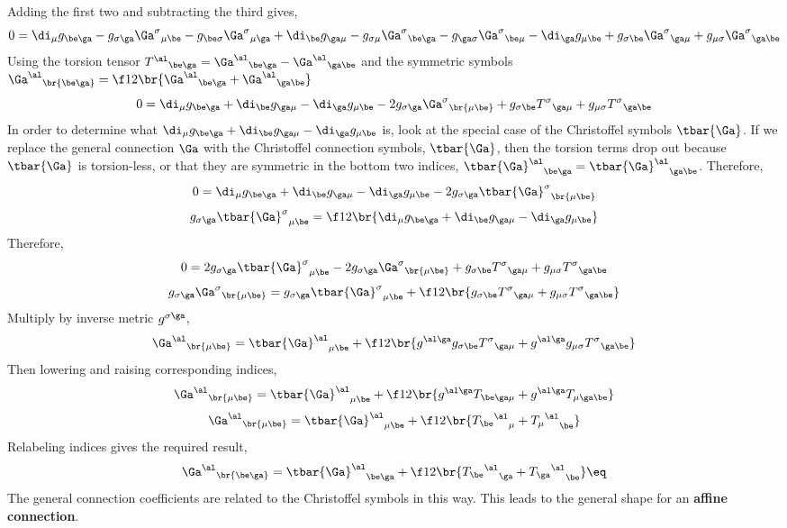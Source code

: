 \documentclass{article}
\begin{document}
Adding the first two and subtracting the third gives,
\[ 0 = \di_\mu g_{\be\ga} - g_{\sigma\ga} {\Ga^\sigma}_{\mu\be}  - g_{\be\sigma}  {\Ga^\sigma}_{\mu\ga} + \di_\be g_{\ga\mu} - g_{\sigma\mu} {\Ga^\sigma}_{\be\ga}  - g_{\ga\sigma}  {\Ga^\sigma}_{\be\mu} - \di_\ga g_{\mu\be} + g_{\sigma\be} {\Ga^\sigma}_{\ga\mu}  + g_{\mu\sigma}  {\Ga^\sigma}_{\ga\be} \]
Using the torsion tensor ${T^{\al}}_{\be\ga} = {\Ga^{\al}}_{\be\ga}- {\Ga^{\al}}_{\ga\be}$ and the symmetric symbols ${\Ga^{\al}}_{\br{\be\ga}} = \f12\br{{\Ga^{\al}}_{\be\ga} + {\Ga^{\al}}_{\ga\be}}$
\[ 0 = \di_\mu g_{\be\ga} + \di_\be g_{\ga\mu} - \di_\ga g_{\mu\be}- 2g_{\sigma\ga} {\Ga^\sigma}_{\br{\mu\be}}+ g_{\sigma\be} {T^\sigma}_{\ga\mu}  + g_{\mu\sigma}  {T^\sigma}_{\ga\be} \]
In order to determine what $\di_\mu g_{\be\ga} + \di_\be g_{\ga\mu} - \di_\ga g_{\mu\be}$ is, look at the special case of the Christoffel symbols $\tbar{\Ga}$. If we replace the general connection $\Ga$ with the Christoffel connection symbols, $\tbar{\Ga}$, then the torsion terms drop out because $\tbar{\Ga}$ is torsion-less, or that they are symmetric in the bottom two indices, ${\tbar{\Ga}^{\al}}_{\be\ga} = {\tbar{\Ga}^{\al}}_{\ga\be}$. Therefore,
\[ 0 = \di_\mu g_{\be\ga} + \di_\be g_{\ga\mu} - \di_\ga g_{\mu\be}- 2g_{\sigma\ga} {\tbar{\Ga}^\sigma}_{\br{\mu\be}} \]
\[ g_{\sigma\ga} {\tbar{\Ga}^\sigma}_{\mu\be} = \f12 \br{\di_\mu g_{\be\ga} + \di_\be g_{\ga\mu} - \di_\ga g_{\mu\be}} \]
Therefore,
\[ 0 = 2g_{\sigma\ga} {\tbar{\Ga}^\sigma}_{\mu\be}- 2g_{\sigma\ga} {\Ga^\sigma}_{\br{\mu\be}}+ g_{\sigma\be} {T^\sigma}_{\ga\mu}  + g_{\mu\sigma}  {T^\sigma}_{\ga\be} \]
\[ g_{\sigma\ga} {\Ga^\sigma}_{\br{\mu\be}} = g_{\sigma\ga} {\tbar{\Ga}^\sigma}_{\mu\be} + \f12\br{g_{\sigma\be} {T^\sigma}_{\ga\mu}  + g_{\mu\sigma}  {T^\sigma}_{\ga\be}} \]
Multiply by inverse metric $g^{\sigma\ga}$,
\[  {\Ga^\al}_{\br{\mu\be}} = {\tbar{\Ga}^\al}_{\mu\be} + \f12\br{g^{\al\ga}g_{\sigma\be} {T^\sigma}_{\ga\mu}  + g^{\al\ga}g_{\mu\sigma}  {T^\sigma}_{\ga\be}} \]
Then lowering and raising corresponding indices,
\[  {\Ga^\al}_{\br{\mu\be}} = {\tbar{\Ga}^\al}_{\mu\be} + \f12\br{g^{\al\ga} {T}_{\be\ga\mu}  + g^{\al\ga}{T}_{\mu\ga\be}} \]
\[  {\Ga^\al}_{\br{\mu\be}} = {\tbar{\Ga}^\al}_{\mu\be} + \f12\br{{{T_{\be}}^{\al}}_\mu  + {{T_{\mu}}^{\al}}_\be} \]
Relabeling indices gives the required result,
\[  {\Ga^\al}_{\br{\be\ga}} = {\tbar{\Ga}^\al}_{\be\ga} + \f12\br{{{T_{\be}}^{\al}}_\ga  + {{T_{\ga}}^{\al}}_\be} \eq \label{eq:4}\]
The general connection coefficients are related to the Christoffel symbols in this way. This leads to the general shape for an \textbf{affine connection}.\\
\end{document}
